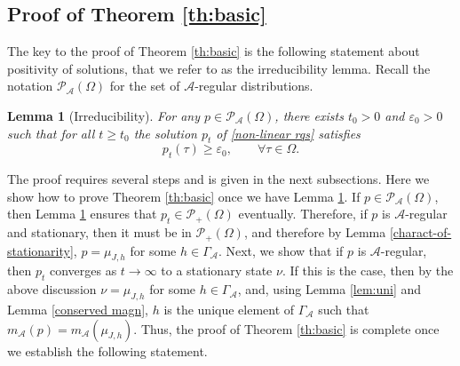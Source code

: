 \documentclass[11pt,reqno]{amsart}
\numberwithin{equation}{section}
\numberwithin{figure}{section}
\newtheorem{lemma}[theorem]{Lemma}
\renewcommand{\geq}{\ge} %
\newcommand{\1}{\mathds{1}}
\let\O=\Omega
\let\G=\Gamma
\newcommand{\cA}{\ensuremath{\mathcal A}}
\newcommand{\cP}{\ensuremath{\mathcal P}}
\begin{document}
\subsection{Proof of Theorem \ref{th:basic}}
The key to the proof of Theorem \ref{th:basic}
is the following statement about positivity of solutions, that we refer to as the irreducibility lemma. Recall the notation $\cP_\cA(\O)$ for the set of $\cA$-regular distributions. 
\begin{lemma}[Irreducibility]\label{lem:irre}
For any $p\in\cP_\cA(\O)$, there exists \(t_0>0\) and \(\varepsilon_0>0\)  such that for all \(t\geq t_0\) the solution \(p_t\) of \eqref{non-linear rqs} satisfies 
\begin{equation} \label{eq:irreb}
p_t( \tau)\geq \varepsilon_0, \qquad \forall\tau\in\Omega.
\end{equation}
\end{lemma}
The proof requires several steps and is given  in the next subsections. Here we show how to prove Theorem \ref{th:basic}
 once we have Lemma \ref{lem:irre}.
If $p\in\cP_\cA(\O)$, then Lemma \ref{lem:irre} ensures that $p_t\in\cP_+(\O)$ eventually. Therefore, if $p$ is $\cA$-regular and stationary, then it must be in $\cP_+(\O)$, and therefore by Lemma \ref{charact-of-stationarity}, $p=\mu_{J,h}$ for some $h\in\G_\cA$. Next, we show that if $p$ is $\cA$-regular, then $p_t$ converges as $t\to\infty$ to a stationary state $\nu$. If this is the case, then by the above discussion $\nu=\mu_{J,h}$ for some $h\in\G_\cA$, and, using Lemma \ref{lem:uni} and Lemma \ref{conserved magn}, $h$ is the unique element of $\G_\cA$ such that $m_\cA(p) = m_{\cA}(\mu_{J,h})$. Thus, the proof of Theorem \ref{th:basic} is complete once we establish the following statement. 
\end{document}
